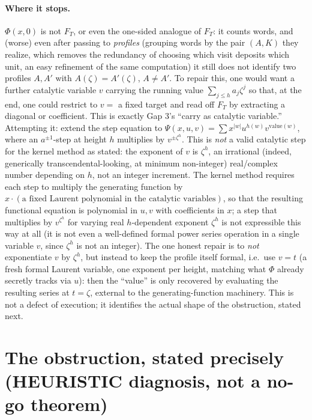 \documentclass[11pt]{article}
\theoremstyle{remark}
\begin{document}
\paragraph{Where it stops.} $\Phi(x,0)$ is not $F_T$, or even the one-sided analogue of $F_T$: it counts
words, and (worse) even after passing to \emph{profiles} (grouping words by the pair $(A,K)$ they
realize, which removes the redundancy of choosing which visit deposits which unit, an easy refinement of
the same computation) it still does not identify two profiles $A,A'$ with $A(\zeta)=A'(\zeta)$,
$A\ne A'$. To repair this, one would want a further catalytic variable $v$ carrying the running value
$\sum_{j\le h}a_j\zeta^j$ so that, at the end, one could restrict to $v=$ a fixed target and read off
$F_T$ by extracting a diagonal or coefficient. This is exactly Gap 3's ``carry as catalytic variable.''
Attempting it: extend the step equation to $\Psi(x,u,v)=\sum x^{|w|}u^{h(w)}v^{\text{value}(w)}$, where
an $a^{\pm1}$-step at height $h$ multiplies by $v^{\pm\zeta^h}$. This is \emph{not} a valid catalytic
step for the kernel method as stated: the exponent of $v$ is $\zeta^h$, an irrational (indeed, generically
transcendental-looking, at minimum non-integer) real/complex number depending on $h$, not an integer
increment. The kernel method requires each step to multiply the generating function by $x\cdot(\text{a
fixed Laurent polynomial in the catalytic variables})$, so that the resulting functional equation is
polynomial in $u,v$ with coefficients in $x$; a step that multiplies by $v^{\zeta^h}$ for varying real
$h$-dependent exponent $\zeta^h$ is not expressible this way at all (it is not even a well-defined
formal power series operation in a single variable $v$, since $\zeta^h$ is not an integer). The one
honest repair is to \emph{not} exponentiate $v$ by $\zeta^h$, but instead to keep the profile itself
formal, i.e.\ use $v=t$ (a fresh formal Laurent variable, one exponent per height, matching what $\Phi$
already secretly tracks via $u$): then the ``value'' is only recovered by evaluating the resulting series
at $t=\zeta$, external to the generating-function machinery. This is not a defect of execution; it
identifies the actual shape of the obstruction, stated next.

\section{The obstruction, stated precisely (HEURISTIC diagnosis, not a no-go theorem)}\label{sec:obstruction}
\end{document}
